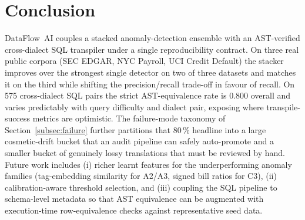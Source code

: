 \documentclass{ieeeaccess}
\begin{document}
\section{Conclusion}
\label{sec:conclusion}

DataFlow~AI couples a stacked anomaly-detection ensemble with an AST-verified cross-dialect SQL
transpiler under a single reproducibility contract. On three real public corpora (SEC EDGAR, NYC
Payroll, UCI Credit Default) the stacker improves over the strongest single detector on two of three
datasets and matches it on the third while shifting the precision/recall trade-off in favour of recall.
On \num{575} cross-dialect SQL pairs the strict AST-equivalence rate is \num{0.800} overall and varies
predictably with query difficulty and dialect pair, exposing where transpile-success metrics are
optimistic. The failure-mode taxonomy of Section~\ref{subsec:failure} further partitions that 80\,\%
headline into a large cosmetic-drift bucket that an audit pipeline can safely auto-promote and a
smaller bucket of genuinely lossy translations that must be reviewed by hand. Future work includes
(i) richer learnt features for the underperforming anomaly families (tag-embedding similarity for
A2/A3, signed bill ratios for C3), (ii) calibration-aware threshold selection, and (iii) coupling the
SQL pipeline to schema-level metadata so that AST equivalence can be augmented with execution-time
row-equivalence checks against representative seed data.



\end{document}
